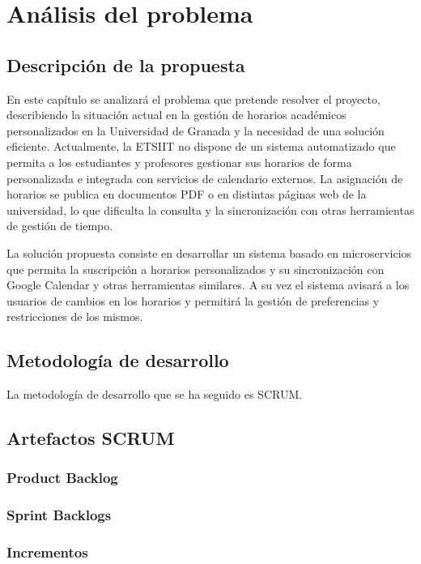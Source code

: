 \chapter{Análisis del problema}\label{cap:analisis}

\section{Descripción de la propuesta}
En este capítulo se analizará el problema que pretende resolver el proyecto,
describiendo la situación actual en la gestión de horarios académicos personalizados en la Universidad de Granada y la necesidad de una solución eficiente.
Actualmente, la ETSIIT no dispone de un sistema automatizado que permita a los estudiantes y profesores gestionar sus horarios de forma personalizada e
integrada con servicios de calendario externos. La asignación de horarios se publica en documentos PDF o en distintas páginas web de la universidad, 
lo que dificulta la consulta y la sincronización con otras herramientas de gestión de tiempo.

La solución propuesta consiste en desarrollar un sistema basado en microservicios que permita la suscripción a horarios personalizados y su sincronización con Google Calendar y otras herramientas similares.
A su vez el sistema avisará a los usuarios de cambios en los horarios y permitirá la gestión de preferencias y restricciones de los mismos.

\section{Metodología de desarrollo}
La metodología de desarrollo que se ha seguido es SCRUM.

\section{Artefactos SCRUM}

\subsection{Product Backlog}

\subsection{Sprint Backlogs}

\subsection{Incrementos}

